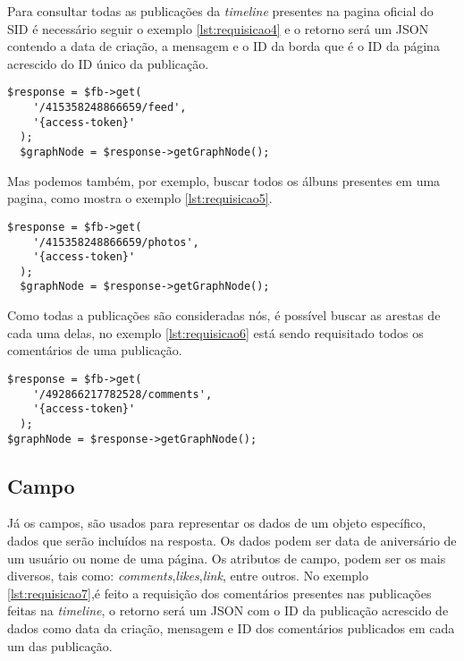 Para consultar todas as publicações da \textit{timeline} presentes na pagina oficial do SID é necessário seguir o exemplo \ref{lst:requisicao4} e o retorno será um JSON contendo a data de criação, a mensagem e o ID da borda que é o ID da página acrescido do ID único da publicação.

\begin{lstlisting}[caption={Requisitando todas as publicações de uma página},label={lst:requisicao4}]
  $response = $fb->get( 
    '/415358248866659/feed', 
    '{access-token}'
  );
  $graphNode = $response->getGraphNode();
\end{lstlisting}

Mas podemos também, por exemplo, buscar todos os álbuns presentes em uma pagina, como mostra o exemplo \ref{lst:requisicao5}.

\begin{lstlisting}[caption={Requisitando todas álbuns de uma página},label={lst:requisicao5}]
  $response = $fb->get( 
    '/415358248866659/photos', 
    '{access-token}'
  );
  $graphNode = $response->getGraphNode();
\end{lstlisting}

Como todas a publicações são consideradas nós, é possível buscar as arestas de cada uma delas, no exemplo \ref{lst:requisicao6} está sendo requisitado todos os comentários de uma publicação.

\begin{lstlisting}[caption={Requisitando todos os comentários de uma publicação},label={lst:requisicao6}]
  $response = $fb->get(
    '/492866217782528/comments',
    '{access-token}'
  );
$graphNode = $response->getGraphNode();
\end{lstlisting}

\subsection{Campo}
Já os campos, são usados para representar os dados de um objeto específico, dados que serão incluídos na resposta. Os dados podem ser data de aniversário de um usuário ou nome de uma página. Os atributos de campo, podem ser os mais diversos, tais como: \textit{comments},\textit{likes},\textit{link}, entre outros. No exemplo \ref{lst:requisicao7},é feito a requisição dos comentários presentes nas publicações feitas na \textit{timeline}, o retorno será um JSON com o ID da publicação acrescido de dados como data da criação, mensagem e ID dos comentários publicados em cada um das publicação.

